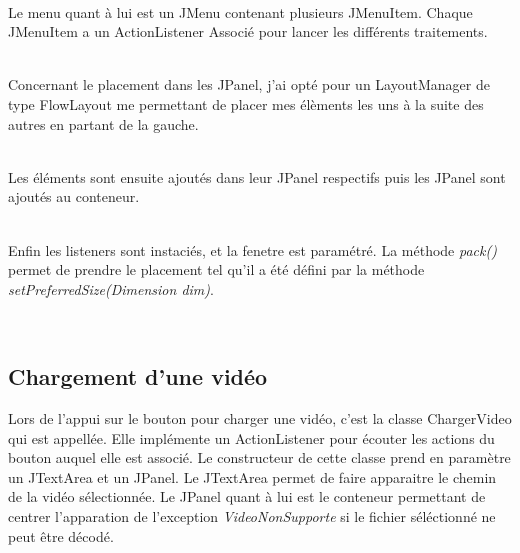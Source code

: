 \documentclass[10pt,a4paper]{article}
\begin{document}

~~\\

Le menu quant à lui est un JMenu contenant plusieurs JMenuItem. Chaque JMenuItem a un ActionListener Associé pour lancer les différents traitements.


~~\\


Concernant le placement dans les JPanel, j'ai opté pour un LayoutManager de type FlowLayout me permettant de placer mes élèments les uns à la suite des autres en partant de la gauche.


~~\\

Les éléments sont ensuite ajoutés dans leur JPanel respectifs puis les JPanel sont ajoutés au conteneur.


~~\\

Enfin les listeners sont instaciés, et la fenetre est paramétré. La méthode \textit{pack()} permet de prendre le placement tel qu'il a été défini par la méthode \textit{setPreferredSize(Dimension dim)}.


~~\\
\subsection{Chargement d'une vidéo}

Lors de l'appui sur le bouton pour charger une vidéo, c'est la classe ChargerVideo qui est appellée. Elle implémente un ActionListener pour écouter les actions du bouton auquel elle est associé.
Le constructeur de cette classe prend en paramètre un JTextArea et un JPanel. Le JTextArea permet de faire apparaitre le chemin de la vidéo sélectionnée. Le JPanel quant à lui est le conteneur permettant
de centrer l'apparation de l'exception \textit{VideoNonSupporte} si le fichier séléctionné ne peut être décodé.
\end{document}
